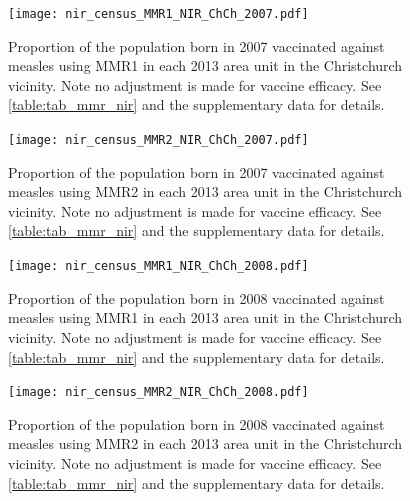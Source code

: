 \documentclass{article}
\begin{document}
\begin{figure}
\begin{center}
\texttt{[image: nir\_census\_MMR1\_NIR\_ChCh\_2007.pdf]}
\end{center}
    \caption{Proportion of the population born in 2007 vaccinated against measles using MMR1 in each 2013 area unit in the Christchurch vicinity. Note no adjustment is made for vaccine efficacy. See \autoref{table:tab_mmr_nir} and the supplementary data for details.}
\label{fig:fig12007_c}
\end{figure}


\begin{figure}
\begin{center}
    \texttt{[image: nir\_census\_MMR2\_NIR\_ChCh\_2007.pdf]}
\end{center}
    \caption{Proportion of the population born in 2007 vaccinated against measles using MMR2 in each 2013 area unit in the Christchurch vicinity. Note no adjustment is made for vaccine efficacy. See \autoref{table:tab_mmr_nir} and the supplementary data for details.}
\label{fig:fig22007_c}
\end{figure}


\begin{figure}
\begin{center}
    \texttt{[image: nir\_census\_MMR1\_NIR\_ChCh\_2008.pdf]}
\end{center}
    \caption{Proportion of the population born in 2008 vaccinated against measles using MMR1 in each 2013 area unit in the Christchurch vicinity. Note no adjustment is made for vaccine efficacy. See \autoref{table:tab_mmr_nir} and the supplementary data for details.}
\label{fig:fig12008_c}
\end{figure}


\begin{figure}
\begin{center}
    \texttt{[image: nir\_census\_MMR2\_NIR\_ChCh\_2008.pdf]}
 \end{center}
    \caption{Proportion of the population born in 2008 vaccinated against measles using MMR2 in each 2013 area unit in the Christchurch vicinity. Note no adjustment is made for vaccine efficacy. See \autoref{table:tab_mmr_nir} and the supplementary data for details.}
\label{fig:fig22008_c}
\end{figure}
\end{document}
